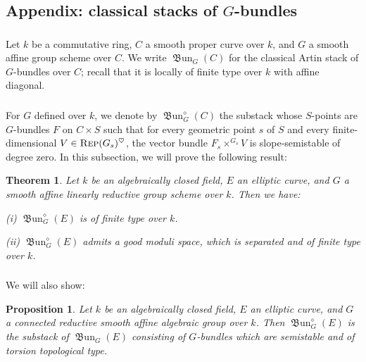 \documentclass[12pt, oneside]{amsart}
\numberwithin{equation}{section}
\newtheorem{theorem}[subsubsection]{Theorem}
\newtheorem{proposition}[subsubsection]{Proposition}
\theoremstyle{remark}
\theoremstyle{plain}
\newcommand{\Rep}{\textsc{Rep}}
\newcommand{\frBun}{\operatorname{\mathfrak{B}un}}
\begin{document}
\subsection{Appendix: classical stacks of $G$-bundles}\label{ssec:BunG}

\subsubsection{}

Let $k$ be a commutative ring, $C$ a smooth proper curve over $k$, and $G$ a smooth affine group scheme over $C$.
We write $\frBun_G(C)$ for the classical Artin stack of $G$-bundles over $C$; recall that it is locally of finite type over $k$ with affine diagonal.

\subsubsection{}\label{sssec:BunG diamond}

For $G$ defined over $k$, we denote by $\frBun_G^{\diamond}(C)$ the substack whose $S$-points are $G$-bundles $F$ on $C \times S$ such that for every geometric point $s$ of $S$ and every finite-dimensional $V \in \Rep(G_s)^\heartsuit$, the vector bundle $F_s \times^{G_s} V$ is slope-semistable of degree zero.
In this subsection, we will prove the following result:

\begin{theorem}\label{thm:frBunGdiamond}
	Let $k$ be an algebraically closed field, $E$ an elliptic curve, and $G$ a smooth affine linearly reductive group scheme over $k$.
	Then we have:

	{\rm (i)} $\frBun_G^{\diamond}(E)$ is of finite type over $k$.

 	{\rm (ii)} $\frBun_G^{\diamond}(E)$ admits a good moduli space, which is separated and of finite type over $k$.
\end{theorem}

\subsubsection{}

We will also show:

\begin{proposition}\label{prop:frBunGdiamond vs ss tors top type}
  Let $k$ be an algebraically closed field, $E$ an elliptic curve, and $G$ a connected reductive smooth affine algebraic group over $k$.
  Then $\frBun_G^{\diamond}(E)$ is the substack of $\frBun_G(E)$ consisting of $G$-bundles which are semistable and of torsion topological type.
\end{proposition}
\end{document}
